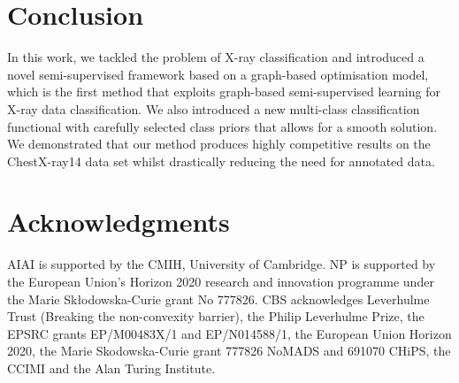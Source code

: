 \documentclass[runningheads]{llncs}
\begin{document}
\section{Conclusion}

In this work, we tackled the problem of X-ray classification and introduced a novel semi-supervised framework based on a graph-based optimisation model, which is the first method that exploits graph-based semi-supervised learning for X-ray data classification. We also introduced a new multi-class classification functional with carefully selected class priors that allows for a smooth solution. We demonstrated that our method produces highly competitive results on the ChestX-ray14 data set whilst drastically reducing the need for annotated data.

\section*{Acknowledgments}
AIAI is supported by the CMIH, University of Cambridge. NP is supported by the European Union’s Horizon 2020 research and innovation programme under the Marie Skłodowska-Curie grant No 777826.
CBS acknowledges  Leverhulme Trust (Breaking the non-convexity barrier), the Philip Leverhulme Prize, the EPSRC grants  EP/M00483X/1 and EP/N014588/1, the European Union Horizon 2020, the Marie Skodowska-Curie grant 777826 NoMADS and 691070 CHiPS, the CCIMI and the Alan Turing Institute.



\end{document}
